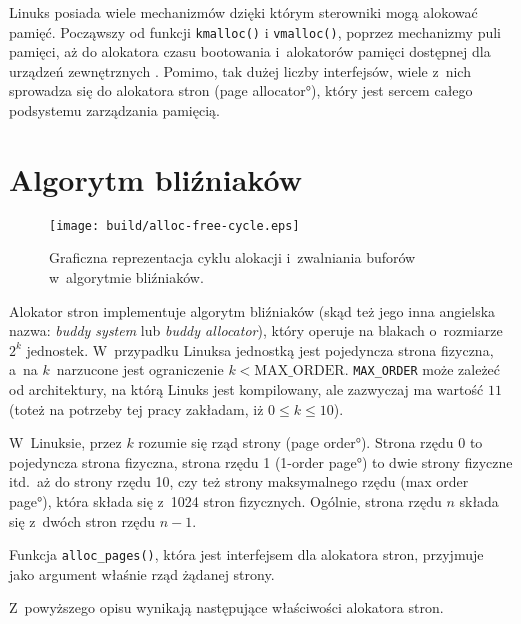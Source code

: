 Linuks posiada wiele mechanizmów dzięki którym sterowniki mogą
alokować pamięć.  Począwszy od funkcji \lstinline|kmalloc()|
i \lstinline|vmalloc()|, poprzez mechanizmy puli pamięci, aż do
alokatora czasu bootowania i~alokatorów pamięci dostępnej dla urządzeń
zewnętrznych \cite[rozdział 8]{bib:ldd3}.  Pomimo, tak dużej liczby
interfejsów, wiele z~nich sprowadza się do alokatora stron (\ang{page
  allocator}), który jest sercem całego podsystemu zarządzania
pamięcią.

\section{Algorytm bliźniaków}

\begin{wrapfigure}{p}{0.4\textwidth}
\begin{center}
\texttt{[image: build/alloc-free-cycle.eps]}
\end{center}
\caption{Graficzna reprezentacja cyklu alokacji i~zwalniania buforów
  w~algorytmie bliźniaków.}
\end{wrapfigure}

Alokator stron implementuje algorytm bliźniaków (skąd też jego inna
angielska nazwa: {\it buddy system} lub {\it buddy allocator}), który
operuje na blakach o~rozmiarze $2^k$ jednostek.  W~przypadku Linuksa
jednostką jest pojedyncza strona fizyczna, a~na $k$~narzucone jest
ograniczenie $k < \mathrm{MAX\_ORDER}$.  \lstinline|MAX_ORDER| może
zależeć od architektury, na którą Linuks jest kompilowany, ale
zazwyczaj ma wartość $11$ (toteż na potrzeby tej pracy zakładam, iż $0
\le k \le 10$).

W~Linuksie, przez $k$ rozumie się rząd strony (\ang{page order}).
Strona rzędu 0 to pojedyncza strona fizyczna, strona rzędu 1
(\ang{1-order page}) to dwie strony fizyczne itd.\ aż do strony rzędu
10, czy też strony maksymalnego rzędu (\ang{max order page}), która
składa się z~1024 stron fizycznych.  Ogólnie, strona rzędu $n$ składa
się z~dwóch stron rzędu $n-1$.

Funkcja \lstinline|alloc_pages()|, która jest interfejsem dla
alokatora stron, przyjmuje jako argument właśnie rząd żądanej strony.

Z~powyższego opisu wynikają następujące właściwości alokatora stron.

